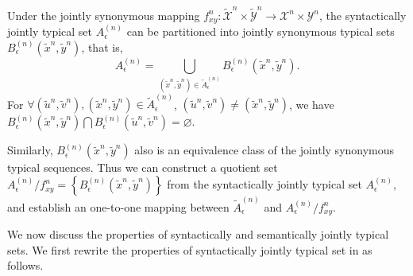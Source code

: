 \documentclass[12pt, draftclsnofoot,onecolumn]{IEEEtran}
\begin{document}
Under the jointly synonymous mapping $f_{xy}^n:\tilde{\mathcal{X}}^n \times \tilde{\mathcal{Y}}^n\to {\mathcal{X}}^n\times {\mathcal{Y}}^n$, the syntactically jointly typical set $A_{\epsilon}^{(n)}$ can be partitioned into jointly synonymous typical sets $B_{\epsilon}^{(n)}\left(\tilde{x}^n,\tilde{y}^n\right)$, that is,
\begin{equation}
A_{\epsilon}^{(n)}=\bigcup_{(\tilde{x}^n,\tilde{y}^n)\in \tilde{A}_{\epsilon}^{(n)}} B_{\epsilon}^{(n)}\left(\tilde{x}^n,\tilde{y}^n\right).
\end{equation}
For $\forall (\tilde{u}^n, \tilde{v}^n),(\tilde{x}^n, \tilde{y}^n)\in \tilde{A}_{\epsilon}^{(n)}$, $(\tilde{u}^n,\tilde{v}^n)\neq (\tilde{x}^n,\tilde{y}^n)$, we have $B_{\epsilon}^{(n)}\left(\tilde{x}^n,\tilde{y}^n\right) \bigcap B_{\epsilon}^{(n)}\left(\tilde{u}^n,\tilde{v}^n\right)=\varnothing$.

Similarly, $B_{\epsilon}^{(n)}\left(\tilde{x}^n,\tilde{y}^n\right)$ also is an equivalence class of the jointly synonymous typical sequences. Thus we can construct a quotient set $A_{\epsilon}^{(n)}/f_{xy}^n=\left\{B_{\epsilon}^{(n)}(\tilde{x}^n,\tilde{y}^n)\right\}$ from the syntactically jointly typical set $A_{\epsilon}^{(n)}$, and establish an one-to-one mapping between $\tilde{A}_{\epsilon}^{(n)}$ and $A_{\epsilon}^{(n)}/f_{xy}^n$.


We now discuss the properties of syntactically and semantically jointly typical sets. We first rewrite the properties of syntactically jointly typical set in \cite{Book_Cover} as follows.
\end{document}
